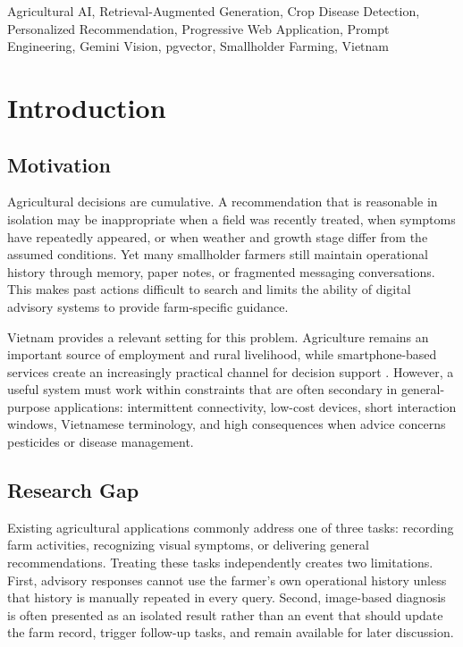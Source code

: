 \documentclass[conference]{IEEEtran}
\begin{document}
\begin{IEEEkeywords}
Agricultural AI, Retrieval-Augmented Generation, Crop Disease Detection, Personalized Recommendation, Progressive Web Application, Prompt Engineering, Gemini Vision, pgvector, Smallholder Farming, Vietnam
\end{IEEEkeywords}

\section{Introduction}

\subsection{Motivation}

Agricultural decisions are cumulative. A recommendation that is reasonable in isolation may be inappropriate when a field was recently treated, when symptoms have repeatedly appeared, or when weather and growth stage differ from the assumed conditions. Yet many smallholder farmers still maintain operational history through memory, paper notes, or fragmented messaging conversations. This makes past actions difficult to search and limits the ability of digital advisory systems to provide farm-specific guidance.

Vietnam provides a relevant setting for this problem. Agriculture remains an important source of employment and rural livelihood, while smartphone-based services create an increasingly practical channel for decision support \cite{worldbankAgEmployment}. However, a useful system must work within constraints that are often secondary in general-purpose applications: intermittent connectivity, low-cost devices, short interaction windows, Vietnamese terminology, and high consequences when advice concerns pesticides or disease management.

\subsection{Research Gap}

Existing agricultural applications commonly address one of three tasks: recording farm activities, recognizing visual symptoms, or delivering general recommendations. Treating these tasks independently creates two limitations. First, advisory responses cannot use the farmer's own operational history unless that history is manually repeated in every query. Second, image-based diagnosis is often presented as an isolated result rather than an event that should update the farm record, trigger follow-up tasks, and remain available for later discussion.
\end{document}

